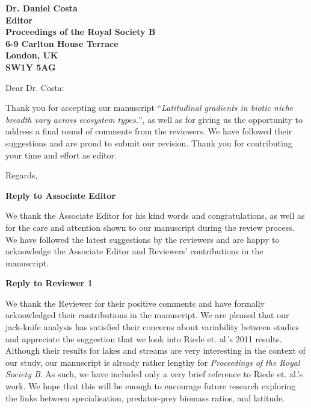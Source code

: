 \documentclass[12pt]{letter}
\newcommand{\mytitle}{\emph{Latitudinal gradients in biotic niche breadth vary across ecosystem types.}}
\newcommand{\myjournal}{\emph{Proceedings of the Royal Society B}}
\begin{document}
\begin{letter}{\bf Dr. Daniel Costa\\
               Editor\\
               Proceedings of the Royal Society B\\
               6-9 Carlton House Terrace\\
               London, UK\\
               SW1Y 5AG\\
                }

\opening{Dear Dr. Costa:}

Thank you for accepting our manuscript ``\mytitle'', as well as for giving us
the opportunity to address a final round of comments from the reviewers. We
have followed their suggestions and are proud to submit our revision.
Thank you for contributing your time and effort as editor.


\closing{Regards,}


\end{letter}

\newpage

\setcounter{page}{1}


{\Large \bf Reply to Associate Editor}

  We thank the Associate Editor for his kind words and congratulations, as
  well as for the care and attention shown to our manuscript during the review
  process. We have followed the latest suggestions by the reviewers and are
  happy to acknowledge the Associate Editor and Reviewers' 
  contributions in the manuscript.


{\Large \bf Reply to Reviewer 1}

  We thank the Reviewer for their positive comments and have formally
  acknowledged their contributions in the manuscript. We are pleased that our
  jack-knife analysis has satisfied their concerns about variability between
  studies and appreciate the suggestion that we look into Riede et. al.'s 2011
  results. Although their results for lakes and streams are very interesting
  in the context of our study, our manuscript is already rather lengthy for
  \myjournal. As such, we have included only a very brief reference to Riede
  et. al.'s work. We hope that this will be enough to encourage future
  research exploring the links between specialisation, predator-prey biomass
  ratios, and latitude.
 
\end{document}
